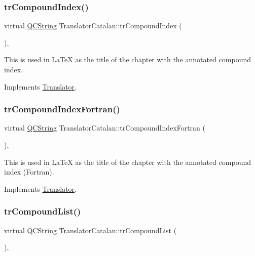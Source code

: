 \subsubsection{\texorpdfstring{trCompoundIndex()}{trCompoundIndex()}}
{\footnotesize\ttfamily virtual \mbox{\hyperlink{class_q_c_string}{Q\+C\+String}} Translator\+Catalan\+::tr\+Compound\+Index (\begin{DoxyParamCaption}{ }\end{DoxyParamCaption})\hspace{0.3cm}{\ttfamily [inline]}, {\ttfamily [virtual]}}

This is used in La\+TeX as the title of the chapter with the annotated compound index. 

Implements \mbox{\hyperlink{class_translator}{Translator}}.

\mbox{\label{class_translator_catalan_a21707b1878ddd4bf604ade5cd1e651ca}} 
\subsubsection{\texorpdfstring{trCompoundIndexFortran()}{trCompoundIndexFortran()}}
{\footnotesize\ttfamily virtual \mbox{\hyperlink{class_q_c_string}{Q\+C\+String}} Translator\+Catalan\+::tr\+Compound\+Index\+Fortran (\begin{DoxyParamCaption}{ }\end{DoxyParamCaption})\hspace{0.3cm}{\ttfamily [inline]}, {\ttfamily [virtual]}}

This is used in La\+TeX as the title of the chapter with the annotated compound index (Fortran). 

Implements \mbox{\hyperlink{class_translator}{Translator}}.

\mbox{\label{class_translator_catalan_a6b90fe58ceb23d1c55103a78f999233e}} 
\subsubsection{\texorpdfstring{trCompoundList()}{trCompoundList()}}
{\footnotesize\ttfamily virtual \mbox{\hyperlink{class_q_c_string}{Q\+C\+String}} Translator\+Catalan\+::tr\+Compound\+List (\begin{DoxyParamCaption}{ }\end{DoxyParamCaption})\hspace{0.3cm}{\ttfamily [inline]}, {\ttfamily [virtual]}}

